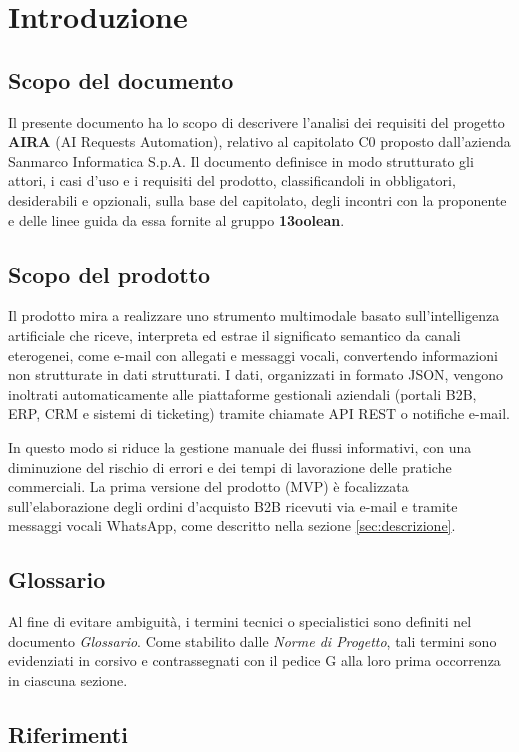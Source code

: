 \section{Introduzione}
\subsection{Scopo del documento}
Il presente documento ha lo scopo di descrivere l'analisi dei requisiti del progetto \textbf{AIRA} (AI Requests Automation), relativo al capitolato C0 proposto dall'azienda Sanmarco Informatica S.p.A. Il documento definisce in modo strutturato gli attori, i casi d'uso e i requisiti del prodotto, classificandoli in obbligatori, desiderabili e opzionali, sulla base del capitolato, degli incontri con la proponente e delle linee guida da essa fornite al gruppo \textbf{13oolean}.

\subsection{Scopo del prodotto}
Il prodotto mira a realizzare uno strumento multimodale basato sull'intelligenza artificiale che riceve, interpreta ed estrae il significato semantico da canali eterogenei, come e-mail con allegati e messaggi vocali, convertendo informazioni non strutturate in dati strutturati. I dati, organizzati in formato JSON, vengono inoltrati automaticamente alle piattaforme gestionali aziendali (portali B2B, ERP, CRM e sistemi di ticketing) tramite chiamate API REST o notifiche e-mail.

In questo modo si riduce la gestione manuale dei flussi informativi, con una diminuzione del rischio di errori e dei tempi di lavorazione delle pratiche commerciali. La prima versione del prodotto (MVP) è focalizzata sull'elaborazione degli ordini d'acquisto B2B ricevuti via e-mail e tramite messaggi vocali WhatsApp, come descritto nella sezione \ref{sec:descrizione}.

\subsection{Glossario}
Al fine di evitare ambiguità, i termini tecnici o specialistici sono definiti nel documento \textit{Glossario}. Come stabilito dalle \textit{Norme di Progetto}, tali termini sono evidenziati in corsivo e contrassegnati con il pedice G alla loro prima occorrenza in ciascuna sezione.

\subsection{Riferimenti}
